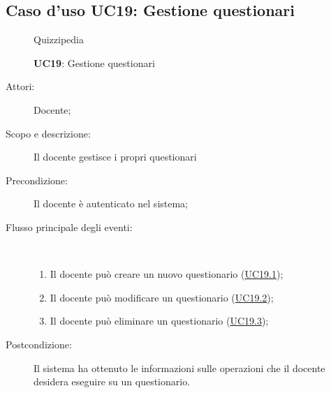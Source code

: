 \subsection{Caso d'uso UC19: Gestione questionari}
\begin{figure}[H]
	\centering
	\begin{resizedtikzpicture}{\textwidth}
		\begin{umlsystem}[x=0, fill=lightgray!20]{Quizzipedia}
		\end{umlsystem}
	\end{resizedtikzpicture}
	\caption{\textbf{UC19}: Gestione questionari}
	\label{UC19}
\end{figure}
\begin{description}
	\item[Attori:] Docente;
	\item[Scopo e descrizione:] Il docente gestisce i propri questionari
	\item[Precondizione:] Il docente è autenticato nel sistema;
	
	\item[Flusso principale degli eventi:] \ 
	\begin{enumerate}
		\item Il docente può creare un nuovo questionario (\hyperlink{UC19.1}{UC19.1});
		\item Il docente può modificare un questionario (\hyperlink{UC19.2}{UC19.2});
		\item Il docente può eliminare un questionario (\hyperlink{UC19.3}{UC19.3});
		
	\end{enumerate}
	\item[Postcondizione:] Il sistema ha ottenuto le informazioni sulle operazioni che il docente desidera eseguire su un questionario.
\end{description}
\hypertarget{UC19.1}{}
